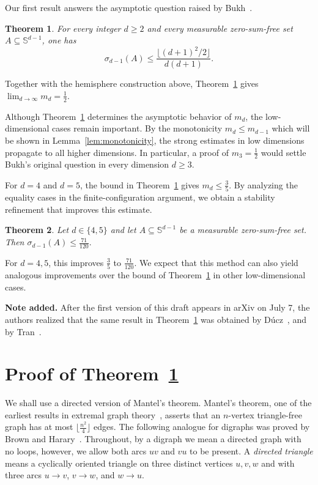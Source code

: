 \documentclass[11pt]{article}
\newtheorem{theorem}{Theorem}[section]
\theoremstyle{definition}
\begin{document}
Our first result answers the asymptotic question raised by Bukh~\cite{BukhProblems}.

\begin{theorem}\label{thm:main}
For every integer \(d\ge 2\) and every measurable zero-sum-free set
\(A\subseteq \mathbb S^{d-1}\), one has
\[
    \sigma_{d-1}(A)
    \le
    \frac{\lfloor (d+1)^2/2\rfloor}{d(d+1)}.
\]
\end{theorem}

Together with the hemisphere construction above,
Theorem~\ref{thm:main} gives \(
    \lim_{d\to\infty}m_d=\frac{1}{2}.
\)

Although Theorem~\ref{thm:main} determines the asymptotic behavior of
\(m_d\), the low-dimensional cases remain important. 
By the monotonicity
$ m_d\le m_{d-1}$ which will be shown in Lemma~\ref{lem:monotonicity}, the strong estimates in low dimensions propagate to all higher
dimensions. In particular, a proof of \(m_3=\frac{1}{2}\) would settle
Bukh's original question in every dimension \(d\ge 3\).

For \(d=4\) and \(d=5\), the bound in Theorem~\ref{thm:main} gives
$   m_d\le \frac{3}{5}.$
By analyzing the equality cases in the finite-configuration argument, 
we obtain a stability refinement that improves this estimate.

\begin{theorem}\label{thm:S3-H4-bound}
Let \(d\in\{4,5\}\) and let
\(A\subseteq \mathbb S^{d-1}\) be a measurable zero-sum-free set.
Then
\(
    \sigma_{d-1}(A)\le \frac{71}{120}.
\)
\end{theorem}

For \(d=4,5\), this improves \(\frac{3}{5}\) to
\(\frac{71}{120}\). 
We expect that this method can also yield analogous improvements over the bound of Theorem~\ref{thm:main} in other
low-dimensional cases.

\textbf{Note added.} After the first version of this draft appears in arXiv on July 7, the authors realized that the same result in Theorem~\ref{thm:main} was obtained by D\'{u}cz~\cite{2026ducz}, and by Tran~\cite{TuanPC}. 





\section{Proof of Theorem~\ref{thm:main}}
We shall use a directed version of Mantel's theorem. Mantel's theorem, one
of the earliest results in extremal graph theory~\cite{1907Mantel}, asserts
that an \(n\)-vertex triangle-free graph has at most \(\lfloor \frac{n^{2}}{4}\rfloor\)
edges. The following analogue for digraphs was proved by Brown and
Harary~\cite{1970BH}. Throughout, by a digraph we mean a directed graph with
no loops, however, we allow both arcs \(uv\) and \(vu\) to be present. A
\emph{directed triangle} means a cyclically oriented triangle on three distinct
vertices \(u,v,w\) and with three arcs \(u\to v\), \(v\to w\), and \(w\to u\).
\end{document}

